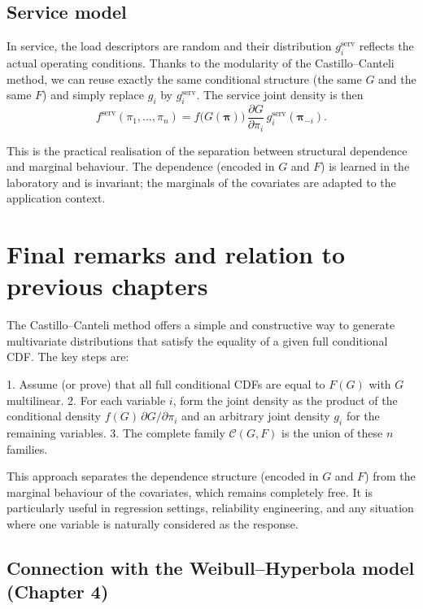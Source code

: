 \subsection{Service model}

In service, the load descriptors are random and their distribution \(g_i^{\text{serv}}\) reflects the actual operating conditions. Thanks to the modularity of the Castillo–Canteli method, we can reuse exactly the same conditional structure (the same \(G\) and the same \(F\)) and simply replace \(g_i\) by \(g_i^{\text{serv}}\). The service joint density is then
\[
f^{\text{serv}}(\pi_1,\ldots,\pi_n) = f\bigl(G(\boldsymbol{\pi})\bigr)\,\frac{\partial G}{\partial\pi_i}\,g_i^{\text{serv}}(\boldsymbol{\pi}_{-i}).
\]

This is the practical realisation of the separation between structural dependence and marginal behaviour. The dependence (encoded in \(G\) and \(F\)) is learned in the laboratory and is invariant; the marginals of the covariates are adapted to the application context.

\section{Final remarks and relation to previous chapters}
\label{sec:cc-conclusion}

The Castillo–Canteli method offers a simple and constructive way to generate multivariate distributions that satisfy the equality of a given full conditional CDF. The key steps are:

1. Assume (or prove) that all full conditional CDFs are equal to \(F(G)\) with \(G\) multilinear.
2. For each variable \(i\), form the joint density as the product of the conditional density \(f(G)\,\partial G/\partial\pi_i\) and an arbitrary joint density \(g_i\) for the remaining variables.
3. The complete family \(\mathcal{C}(G,F)\) is the union of these \(n\) families.

This approach separates the dependence structure (encoded in \(G\) and \(F\)) from the marginal behaviour of the covariates, which remains completely free. It is particularly useful in regression settings, reliability engineering, and any situation where one variable is naturally considered as the response.

\subsection{Connection with the Weibull–Hyperbola model (Chapter 4)}

